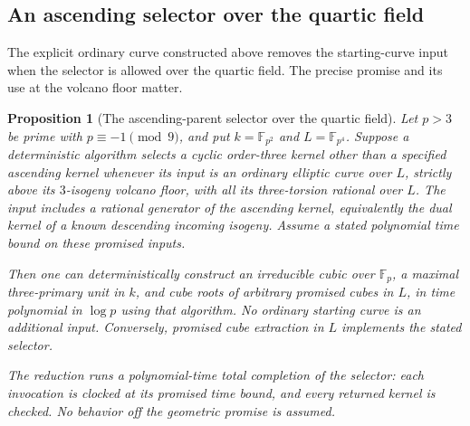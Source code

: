\documentclass[11pt]{article}
\newtheorem{proposition}[theorem]{Proposition}
\theoremstyle{definition}
\theoremstyle{remark}
\begin{document}
\subsection{An ascending selector over the quartic field}
The explicit ordinary curve constructed above removes the starting-curve
input when the selector is allowed over the quartic field. The precise
promise and its use at the volcano floor matter.


\begin{proposition}[The ascending-parent selector over the quartic field]
\label{thm:quartic-ascending-selector}
Let $p>3$ be prime with $p\equiv-1\pmod9$, and put
$k=\mathbb F_{p^2}$ and $L=\mathbb F_{p^4}$.
Suppose a deterministic algorithm selects a cyclic order-three kernel other
than a specified ascending kernel whenever its input is an
ordinary elliptic curve over $L$, strictly above its
$3$-isogeny volcano floor, with all its three-torsion rational
over $L$. The input includes a rational generator of the ascending
kernel, equivalently the dual kernel of a known descending incoming
isogeny. Assume a stated polynomial time bound on these
promised inputs.

Then one can deterministically construct an irreducible cubic
over $\mathbb F_p$, a maximal three-primary unit in $k$, and
cube roots of arbitrary promised cubes in $L$, in time
polynomial in $\log p$ using that algorithm.  No ordinary
starting curve is an additional input.  Conversely, promised
cube extraction in $L$ implements the stated selector.

The reduction runs a polynomial-time total completion of the
selector: each invocation is clocked at its promised time bound,
and every returned kernel is checked.  No behavior off the
geometric promise is assumed.
\end{proposition}
\end{document}
